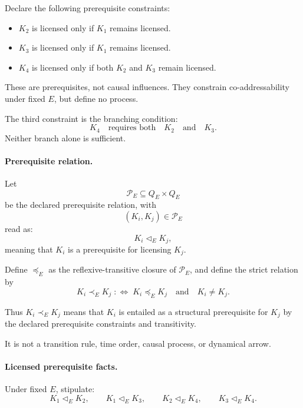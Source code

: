 \documentclass[aps,prx,onecolumn,11pt]{revtex4-2}
\theoremstyle{plain}
\theoremstyle{definition}
\theoremstyle{remark}
\begin{document}
Declare the following prerequisite constraints:

\begin{itemize}

\item \(K_2\) is licensed only if \(K_1\) remains licensed.

\item \(K_3\) is licensed only if \(K_1\) remains licensed.

\item \(K_4\) is licensed only if both \(K_2\) and \(K_3\) remain
licensed.

\end{itemize}

These are prerequisites, not causal influences. They constrain
co-addressability under fixed \(E\), but define no process.

The third constraint is the branching condition:
\[
K_4
\quad
\text{requires both}
\quad
K_2
\quad
\text{and}
\quad
K_3.
\]
Neither branch alone is sufficient.

\paragraph{Prerequisite relation.}

Let
\[
\mathcal P_E\subseteq Q_E\times Q_E
\]
be the declared prerequisite relation, with
\[
(K_i,K_j)\in\mathcal P_E
\]
read as:
\[
K_i\triangleleft_E K_j,
\]
meaning that \(K_i\) is a prerequisite for licensing \(K_j\).

Define \(\preceq_E\) as the reflexive-transitive closure of
\(\mathcal P_E\), and define the strict relation by
\begin{equation}
K_i\prec_E K_j
\;:\Longleftrightarrow\;
K_i\preceq_E K_j
\quad\text{and}\quad
K_i\neq K_j.
\label{eq:toy_branching_prereq_relation}
\end{equation}

Thus \(K_i\prec_E K_j\) means that \(K_i\) is entailed as a structural
prerequisite for \(K_j\) by the declared prerequisite constraints and
transitivity.

It is not a transition rule, time order, causal process, or dynamical
arrow.

\paragraph{Licensed prerequisite facts.}

Under fixed \(E\), stipulate:
\begin{equation}
K_1\triangleleft_E K_2,
\qquad
K_1\triangleleft_E K_3,
\qquad
K_2\triangleleft_E K_4,
\qquad
K_3\triangleleft_E K_4.
\label{eq:toy_branching_prereq_base}
\end{equation}
\end{document}
